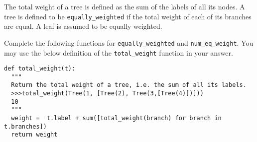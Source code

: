 \question 
The total weight of a tree is defined as the sum of the labels of all its nodes. A tree is defined to be \lstinline{equally_weighted} if the total weight of each of its branches are equal. A leaf is assumed to be equally weighted.

Complete the following functions for \lstinline{equally_weighted} and \lstinline{num_eq_weight}. You may use the below definition of the \lstinline{total_weight} function in your answer.

\begin{lstlisting}
def total_weight(t):
  """
  Return the total weight of a tree, i.e. the sum of all its labels.
  >>>total_weight(Tree(1, [Tree(2), Tree(3,[Tree(4)])]))
  10
  """
  weight =  t.label + sum([total_weight(branch) for branch in t.branches])
  return weight
\end{lstlisting}
